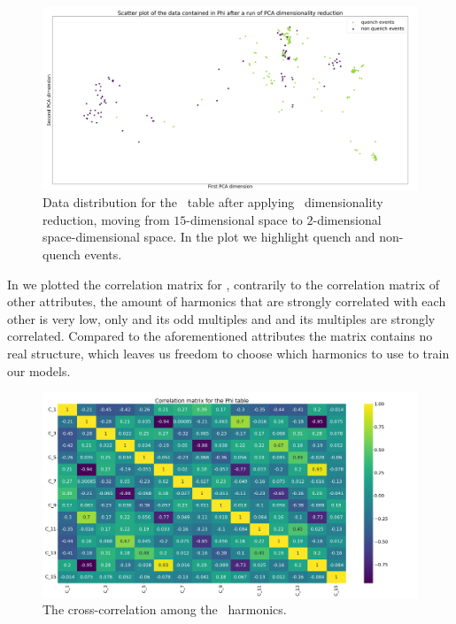 \begin{figure}[!ht]
	\centering
	\includegraphics[width=\linewidth]{img/Phi_distribution.png}
	\caption{Data distribution for the \phin\ table after applying \pca\ dimensionality
		reduction, moving from $15$-dimensional space to $2$-dimensional space-dimensional
		space. In the plot we highlight quench and non-quench events.} \label{fig:phi-dist}
\end{figure}

In  we plotted the correlation matrix for \phin, contrarily to the correlation
matrix of other attributes, the amount of harmonics that are strongly correlated with each other is very
low, only \phin[2] and its odd multiples and \phin[4] and its multiples are strongly correlated. Compared to the
aforementioned attributes the matrix contains no real structure, which leaves us freedom to choose which harmonics to use to train our models.
\begin{figure}[!ht]
	\centering
	\includegraphics[width=\linewidth]{img/Phi_corr_matrix.png}
	\caption{The cross-correlation among the \phin\ harmonics.} \label{fig:phi-corr}
\end{figure}

